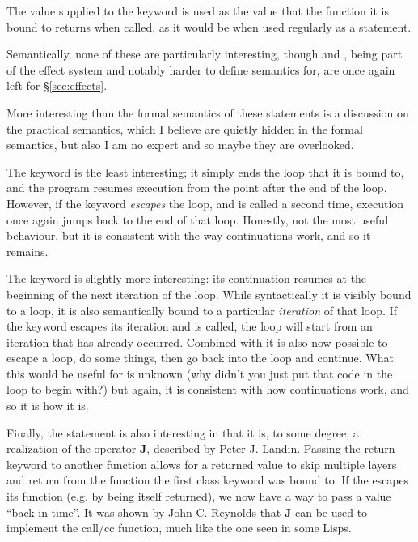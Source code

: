 The value supplied to the  keyword is used as the value that the function
it is bound to returns when called, as it would be when used regularly as a statement.

Semantically, none of these are particularly interesting, though  and , being
part of the effect system and notably harder to define semantics for, are once again
left for \S\ref{sec:effects}.

\begin{prooftree}
\end{prooftree}

\begin{prooftree}
\end{prooftree}

\begin{prooftree}
\end{prooftree}

More interesting than the formal semantics of these statements is a discussion on
the practical semantics, which I believe are quietly hidden in the formal semantics,
but also I am no expert and so maybe they are overlooked.

The  keyword is the least interesting; it simply ends the loop that it
is bound to, and the program resumes execution from the point after the end of the
loop. However, if the  keyword \emph{escapes} the loop, and is called
a second time, execution once again jumps back to the end of that loop. Honestly, not
the most useful behaviour, but it is consistent with the way continuations work, and
so it remains.

The  keyword is slightly more interesting: its continuation resumes
at the beginning of the next iteration of the loop. While syntactically it is visibly
bound to a loop, it is also semantically bound to a particular \emph{iteration} of
that loop. If the  keyword escapes its iteration and is called,
the loop will start from an iteration that has already occurred. Combined with
 it is also now possible to escape a loop, do some things, then go back
into the loop and continue. What this would be useful for is unknown (why didn't
you just put that code in the loop to begin with?) but again, it is consistent with
how continuations work, and so it is how it is.

Finally, the  statement is also interesting in that it is, to some degree,
a realization of the operator \textbf{J}, described by Peter J. Landin\cite{j}.
Passing the return keyword to another function allows for a returned value to skip
multiple layers and return from the function the first class keyword was bound to.
If the  escapes its function (e.g. by being itself returned), we now have
a way to pass a value ``back in time''. It was shown by John C. Reynolds that \textbf{J}
can be used to implement the call/cc function, much like the one seen in some Lisps\cite{defint}.

